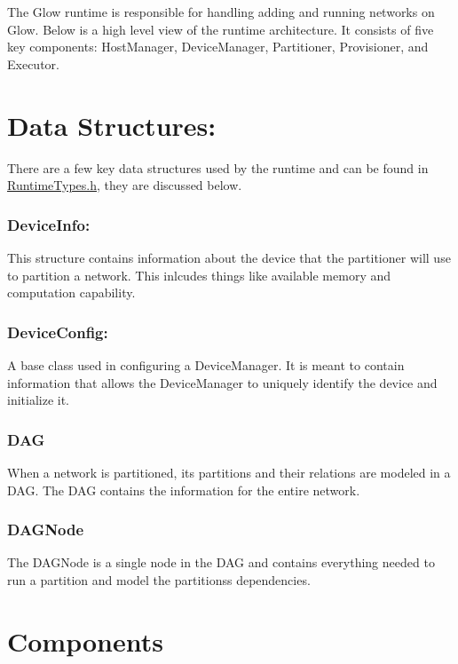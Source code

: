 The Glow runtime is responsible for handling adding and running networks on Glow. Below is a high level view of the runtime architecture. It consists of five key components\+: Host\+Manager, Device\+Manager, Partitioner, Provisioner, and Executor.

\section*{Data Structures\+:}

There are a few key data structures used by the runtime and can be found in \hyperlink{_runtime_types_8h_source}{Runtime\+Types.\+h}, they are discussed below.

\subsubsection*{Device\+Info\+:}

This structure contains information about the device that the partitioner will use to partition a network. This inlcudes things like available memory and computation capability.

\subsubsection*{Device\+Config\+:}

A base class used in configuring a Device\+Manager. It is meant to contain information that allows the Device\+Manager to uniquely identify the device and initialize it.

\subsubsection*{D\+AG}

When a network is partitioned, its partitions and their relations are modeled in a D\+AG. The D\+AG contains the information for the entire network.

\subsubsection*{D\+A\+G\+Node}

The D\+A\+G\+Node is a single node in the D\+AG and contains everything needed to run a partition and model the partitions\textquotesingle{}s dependencies.

\section*{Components}

